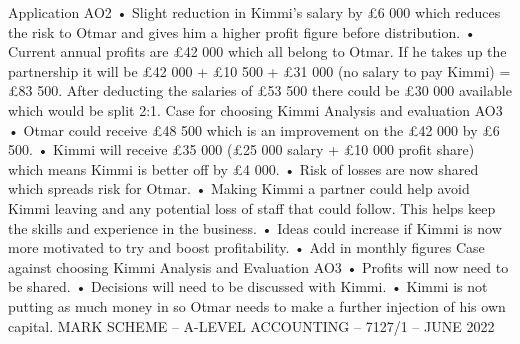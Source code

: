 \documentclass{article}
\begin{document}
 \newline
Application AO2 \newline
• Slight reduction in Kimmi’s salary by £6 000 which reduces the risk to Otmar and gives him a higher \newline
profit figure before distribution. \newline
• Current annual profits are £42 000 which all belong to Otmar.  If he takes up the partnership it will be \newline
£42 000 + £10 500 + £31 000 (no salary to pay Kimmi) = £83 500.  After deducting the salaries          \newline
of £53 500 there could be £30 000 available which would be split 2:1. \newline
 \newline
Case for choosing Kimmi  \newline
 \newline
Analysis and evaluation AO3 \newline
• Otmar could receive £48 500 which is an improvement on the £42 000 by £6 500. \newline
• Kimmi will receive £35 000 (£25 000 salary + £10 000 profit share) which means Kimmi is better off by \newline
£4 000. \newline
• Risk of losses are now shared which spreads risk for Otmar. \newline
• Making Kimmi a partner could help avoid Kimmi leaving and any potential loss of staff that could \newline
follow.  This helps keep the skills and experience in the business. \newline
• Ideas could increase if Kimmi is now more motivated to try and boost profitability. \newline
• Add in monthly figures  \newline
  \newline
Case against choosing Kimmi \newline
 \newline
Analysis and Evaluation AO3 \newline
• Profits will now need to be shared. \newline
• Decisions will need to be discussed with Kimmi. \newline
• Kimmi is not putting as much money in so Otmar needs to make a further injection of his own capital. \newline
MARK SCHEME – A-LEVEL ACCOUNTING – 7127/1 – JUNE 2022 \newline
\end{document}
